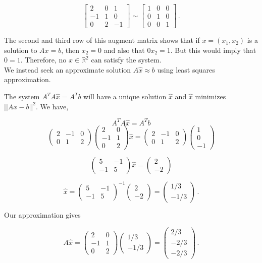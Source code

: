 \documentclass[11pt]{article}
\begin{document}
$$\begin{bmatrix}
2 & 0 & 1 \\ -1 & 1 & 0 \\ 0 & 2 & -1 \end{bmatrix} \sim \begin{bmatrix}
1 & 0 & 0 \\ 0 & 1 & 0 \\ 0& 0 & 1 \end{bmatrix} \,.$$

The second and third row of this augment matrix shows that if $x = (x_1, x_2)$ is a solution to $Ax = b$, then $x_2 = 0$ and also that $0x_2 = 1$. But this would imply that $0 = 1$. Therefore, no $x \in \mathbb{R}^2$ can satisfy the system. \\

We instead seek an approximate solution $A\hat{x} \approx b$ using least squares approximation.

The system $A^TA\hat{x} = A^Tb$ will have a unique solution $\hat{x}$ and $\hat{x}$ minimizes $||Ax-b||^2$. We have,

$$A^TA\hat{x} = A^Tb$$
$$\begin{pmatrix} 2&-1&0 \\ 0&1 &2 \end{pmatrix}
\begin{pmatrix} 2 & 0 \\ -1 & 1 \\ 0 & 2 \end{pmatrix}\hat{x} = \begin{pmatrix} 2&-1&0 \\ 0&1 &2 \end{pmatrix} \begin{pmatrix} 1\\0\\-1 \end{pmatrix}$$

$$\begin{pmatrix} 5&-1 \\ -1&5\end{pmatrix} \hat{x} =
\begin{pmatrix} 2 \\ -2 \end{pmatrix}$$

$$\hat{x} = \begin{pmatrix} 5&-1 \\ -1&5\end{pmatrix}^{-1} \begin{pmatrix} 2 \\ -2 \end{pmatrix} = \begin{pmatrix}
1/3 \\ -1/3 \end{pmatrix} \,.$$

Our approximation gives

$$A\hat{x} = \begin{pmatrix} 2 & 0 \\ -1 & 1 \\ 0 & 2 \end{pmatrix}
\begin{pmatrix}
1/3 \\ -1/3 \end{pmatrix} = \begin{pmatrix}
2/3 \\ -2/3 \\ -2/3
\end{pmatrix} \,. $$
\end{document}
